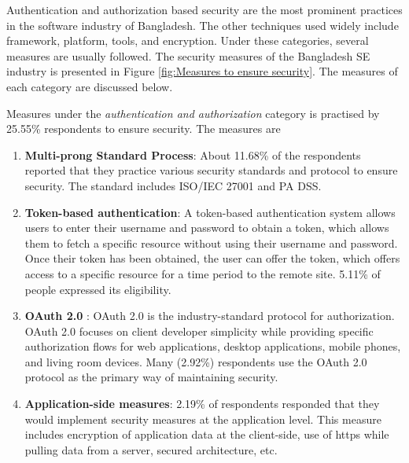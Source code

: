 Authentication and authorization based security are the most prominent practices in the software industry of Bangladesh. The other techniques used widely include framework, platform, tools, and encryption. Under these categories, several measures are usually followed. The security measures of the Bangladesh SE industry is presented in Figure \ref{fig:Measures to ensure security}. The measures of each category are discussed below.

Measures under the \emph{authentication and authorization} category is practised by 25.55\% respondents to ensure security. The measures are 
\begin{enumerate}[label=(\alph*)]

    \item \textbf{Multi-prong Standard Process}: About 11.68\% of the respondents reported that they practice various security standards and protocol to ensure security. The standard includes ISO/IEC 27001 and PA DSS.
    
    \item \textbf{Token-based authentication}: A token-based authentication system allows users to enter their username and password to obtain a token, which allows them to fetch a specific resource without using their username and password. Once their token has been obtained, the user can offer the token, which offers access to a specific resource for a time period to the remote site. 5.11\% of people expressed its eligibility.
    
    \item \textbf{OAuth 2.0} : OAuth 2.0 is the industry-standard protocol for authorization. OAuth 2.0 focuses on client developer simplicity while providing specific authorization flows for web applications, desktop applications, mobile phones, and living room devices. Many (2.92\%) respondents use the OAuth 2.0 protocol as the primary way of maintaining security.
    
    \item \textbf{Application-side measures}: 2.19\% of respondents responded that they would implement security measures at the application level. This measure includes encryption of application data at the client-side, use of https while pulling data from a server, secured architecture, etc.
    

\end{enumerate}
